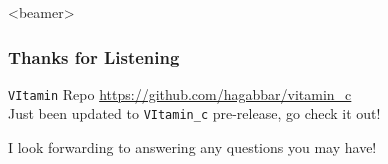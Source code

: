 \documentclass{beamer}
\begin{document}

\begin{frame}<beamer>
\frametitle{Thanks for Listening}

\begin{block}{\texttt{VItamin} Repo}
\centering\textcolor{blue}{\url{https://github.com/hagabbar/vitamin_c}}\\
Just been updated to \texttt{VItamin\_c} pre-release, go check it out!

\end{block}

\vspace{10mm}
\centering \large I look forwarding to answering any questions you may have!
\end{frame}
\end{document}
